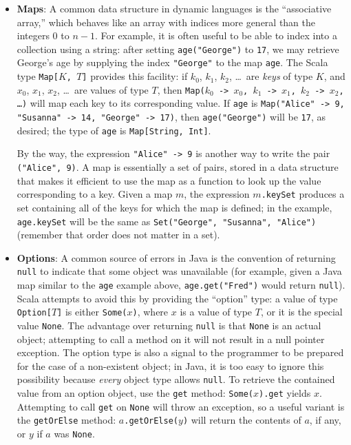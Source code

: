 \begin{itemize}
\item \textbf{Maps}: A common data structure in dynamic languages is the ``associative array,'' which behaves like an array with indices more general than the integers 0 to $n-1$. For example, it is often useful to be able to index into a collection using a string: after setting \texttt{age("George")} to \texttt{17}, we may retrieve George's age by supplying the index \texttt{"George"} to the map \texttt{age}. The Scala type \texttt{Map[$K$, $T$]} provides this facility: if $k_0$, $k_1$, $k_2$, \ldots\ are \emph{keys} of type $K$, and $x_0$, $x_1$, $x_2$, \ldots\ are values of type $T$, then \texttt{Map($k_0$ -> $x_0$, $k_1$ -> $x_1$, $k_2$ -> $x_2$, \ldots)} will map each key to its corresponding value. If \texttt{age} is \texttt{Map("Alice" -> 9, "Susanna" -> 14, "George" -> 17)}, then \texttt{age("George")} will be \texttt{17}, as desired; the type of \texttt{age} is \texttt{Map[String, Int]}.

By the way, the expression \texttt{"Alice" -> 9} is another way to write the pair \texttt{("Alice", 9)}. A map is essentially a set of pairs, stored in a data structure that makes it efficient to use the map as a function to look up the value corresponding to a key. Given a map $m$, the expression \texttt{$m$.keySet} produces a set containing all of the keys for which the map is defined; in the example, \texttt{age.keySet} will be the same as \texttt{Set("George", "Susanna", "Alice")} (remember that order does not matter in a set).

\item \textbf{Options}: A common source of errors in Java is the convention of returning \texttt{null} to indicate that some object was unavailable (for example, given a Java map similar to the \texttt{age} example above, \texttt{age.get("Fred")} would return \texttt{null}). Scala attempts to avoid this by providing the ``option'' type: a value of type \texttt{Option[$T$]} is either \texttt{Some($x$)}, where $x$ is a value of type $T$, or it is the special value \texttt{None}. The advantage over returning \texttt{null} is that \texttt{None} is an actual object; attempting to call a method on it will not result in a null pointer exception. The option type is also a signal to the programmer to be prepared for the case of a non-existent object; in Java, it is too easy to ignore this possibility because \emph{every} object type allows \texttt{null}. To retrieve the contained value from an option object, use the \texttt{get} method: \texttt{Some($x$).get} yields $x$. Attempting to call \texttt{get} on \texttt{None} will throw an exception, so a useful variant is the \texttt{getOrElse} method: \texttt{$a$.getOrElse($y$)} will return the contents of $a$, if any, or $y$ if $a$ was \texttt{None}.


\end{itemize}
